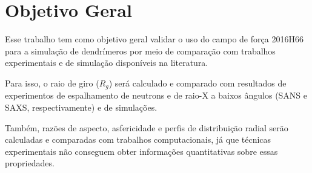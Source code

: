 \chapter{Objetivo Geral}
Esse trabalho tem como objetivo geral validar o uso do campo de força 2016H66\cite{Horta2016} para a simulação de dendrímeros por meio de comparação com trabalhos experimentais e de simulação disponíveis na literatura. 

Para isso, o raio de giro ($R_g$) será calculado e comparado com resultados de experimentos de espalhamento de neutrons e de raio-X a baixos ângulos (SANS e SAXS, respectivamente) e de simulações.

Também, razões de aspecto, asfericidade e perfis de distribuição radial serão calculadas e comparadas com trabalhos computacionais, já que técnicas experimentais não conseguem obter informações quantitativas sobre essas propriedades.

\pagebreak

